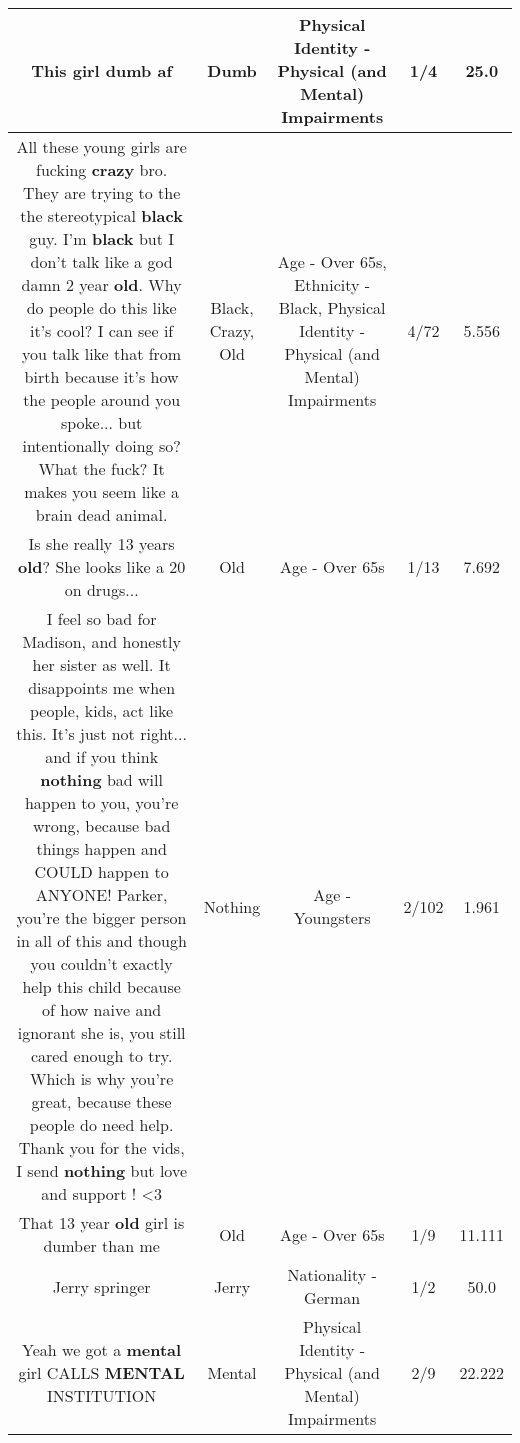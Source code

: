 \documentclass[11pt]{article}
\newlength\mylength
\begin{document}
\begin{center}
\begin{longtable}{|C{.65\mylength}|C{.30\mylength}|C{.12\mylength}|C{.12\mylength}|C{.12\mylength}|}
  \small This girl \textbf{dumb} af\normalsize   & Dumb & Physical Identity - Physical (and Mental) Impairments & 1/4 & 25.0 \\  \hline
  \small All these young girls are fucking \textbf{crazy} bro. They are trying to the the stereotypical \textbf{black} guy. I'm \textbf{black} but I don't talk like a god damn 2 year \textbf{old}. Why do people do this like it's cool? I can see if you talk like that from birth because it's how the people around you spoke... but intentionally doing so? What the fuck? It makes you seem like a brain dead animal.\normalsize   & Black, Crazy, Old & Age - Over 65s, Ethnicity - Black, Physical Identity - Physical (and Mental) Impairments & 4/72 & 5.556 \\  \hline
  \small Is she really 13 years \textbf{old}? She looks like a 20 on drugs...\normalsize   & Old & Age - Over 65s & 1/13 & 7.692 \\  \hline
  \small I feel so bad for Madison, and honestly her sister as well. It disappoints me when people, kids, act like this. It's just not right... and if you think \textbf{nothing} bad will happen to you, you're wrong, because bad things happen and COULD happen to ANYONE! Parker, you're the bigger person in all of this and though you couldn't exactly help this child because of how naive and ignorant she is, you still cared enough to try. Which is why you're great, because these people do need help. Thank you for the vids, I send \textbf{nothing} but love and support ! <3\normalsize   & Nothing & Age - Youngsters & 2/102 & 1.961 \\  \hline
  \small That 13 year \textbf{old} girl is dumber than me\normalsize   & Old & Age - Over 65s & 1/9 & 11.111 \\  \hline
  \small Jerry springer\normalsize   & Jerry & Nationality - German & 1/2 & 50.0 \\  \hline
  \small Yeah we got a \textbf{mental} girl CALLS \textbf{MENTAL} INSTITUTION\normalsize   & Mental & Physical Identity - Physical (and Mental) Impairments & 2/9 & 22.222 \\  \hline

\end{longtable}
\end{center}
\end{document}
